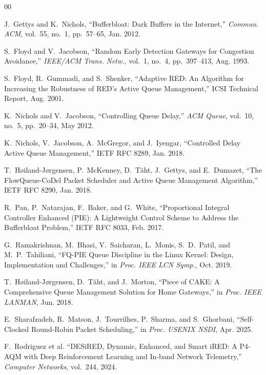 \documentclass[conference]{IEEEtran}
\begin{document}
\begin{thebibliography}{00}

J.~Gettys and K.~Nichols, ``Bufferbloat: Dark Buffers in the Internet,''
\textit{Commun. ACM}, vol.~55, no.~1, pp.~57--65, Jan. 2012.

S.~Floyd and V.~Jacobson, ``Random Early Detection Gateways for Congestion
Avoidance,'' \textit{IEEE/ACM Trans. Netw.}, vol.~1, no.~4, pp.~397--413,
Aug. 1993.

S.~Floyd, R.~Gummadi, and S.~Shenker, ``Adaptive RED: An Algorithm for
Increasing the Robustness of RED's Active Queue Management,'' ICSI Technical
Report, Aug. 2001.

K.~Nichols and V.~Jacobson, ``Controlling Queue Delay,'' \textit{ACM Queue},
vol.~10, no.~5, pp.~20--34, May 2012.

K.~Nichols, V.~Jacobson, A.~McGregor, and J.~Iyengar, ``Controlled Delay Active
Queue Management,'' IETF RFC 8289, Jan. 2018.

T.~H\o{}iland-J\o{}rgensen, P.~McKenney, D.~T\"{a}ht, J.~Gettys, and
E.~Dumazet, ``The FlowQueue-CoDel Packet Scheduler and Active Queue Management
Algorithm,'' IETF RFC 8290, Jan. 2018.

R.~Pan, P.~Natarajan, F.~Baker, and G.~White, ``Proportional Integral Controller
Enhanced (PIE): A Lightweight Control Scheme to Address the Bufferbloat
Problem,'' IETF RFC 8033, Feb. 2017.

G.~Ramakrishnan, M.~Bhasi, V.~Saicharan, L.~Monis, S.~D.~Patil, and
M.~P.~Tahiliani, ``FQ-PIE Queue Discipline in the Linux Kernel: Design,
Implementation and Challenges,'' in \textit{Proc. IEEE LCN Symp.}, Oct. 2019.

T.~H\o{}iland-J\o{}rgensen, D.~T\"{a}ht, and J.~Morton, ``Piece of CAKE: A
Comprehensive Queue Management Solution for Home Gateways,'' in
\textit{Proc. IEEE LANMAN}, Jun. 2018.

E.~Sharafzadeh, R.~Matson, J.~Tourrilhes, P.~Sharma, and S.~Ghorbani,
``Self-Clocked Round-Robin Packet Scheduling,'' in \textit{Proc. USENIX NSDI},
Apr. 2025.

F.~Rodriguez et al. ``DESiRED, Dynamic, Enhanced, and Smart iRED: A P4-AQM
with Deep Reinforcement Learning and In-band Network Telemetry,''
\textit{Computer Networks}, vol.~244, 2024.


\end{thebibliography}
\end{document}
